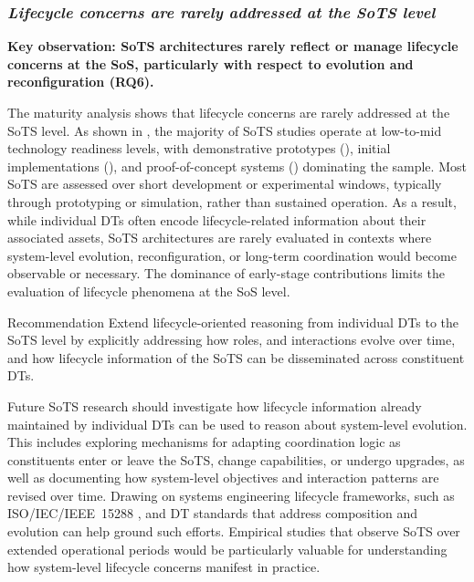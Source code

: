 





\subsubsection{\textit{Lifecycle concerns are rarely addressed at the SoTS level}}

\textbf{Key observation: SoTS architectures rarely reflect or manage lifecycle concerns at the SoS, particularly with respect to evolution and reconfiguration (RQ6).}

The maturity analysis shows that lifecycle concerns are rarely addressed at the SoTS level. As shown in , the majority of SoTS studies operate at low-to-mid technology readiness levels, with demonstrative prototypes (), initial implementations (), and proof-of-concept systems () dominating the sample. Most SoTS are assessed over short development or experimental windows, typically through prototyping or simulation, rather than sustained operation. As a result, while individual DTs often encode lifecycle-related information about their associated assets, SoTS architectures are rarely evaluated in contexts where system-level evolution, reconfiguration, or long-term coordination would become observable or necessary. The dominance of early-stage contributions limits the evaluation of lifecycle phenomena at the SoS level.

\begin{recoframe}{Recommendation}
Extend lifecycle-oriented reasoning from individual DTs to the SoTS level by explicitly addressing how roles, and interactions evolve over time, and how lifecycle information of the SoTS can be disseminated across constituent DTs.
\end{recoframe}

Future SoTS research should investigate how lifecycle information already maintained by individual DTs can be used to reason about system-level evolution. This includes exploring mechanisms for adapting coordination logic as constituents enter or leave the SoTS, change capabilities, or undergo upgrades, as well as documenting how system-level objectives and interaction patterns are revised over time. Drawing on systems engineering lifecycle frameworks, such as ISO/IEC/IEEE~15288 \cite{7106435}, and DT standards that address composition and evolution can help ground such efforts. Empirical studies that observe SoTS over extended operational periods would be particularly valuable for understanding how system-level lifecycle concerns manifest in practice.




















